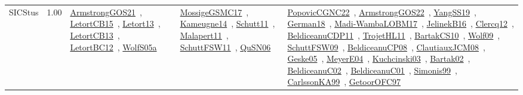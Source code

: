 {\begin{longtable}{p{3cm}r>{\raggedright\arraybackslash}p{6cm}>{\raggedright\arraybackslash}p{6cm}>{\raggedright\arraybackslash}p{8cm}}
\index{SICStus}\index{CPSystems!SICStus}SICStus &  1.00 & \href{../works/ArmstrongGOS21.pdf}{ArmstrongGOS21}~\cite{ArmstrongGOS21}, \href{../works/LetortCB15.pdf}{LetortCB15}~\cite{LetortCB15}, \href{../works/Letort13.pdf}{Letort13}~\cite{Letort13}, \href{../works/LetortCB13.pdf}{LetortCB13}~\cite{LetortCB13}, \href{../works/LetortBC12.pdf}{LetortBC12}~\cite{LetortBC12}, \href{../works/WolfS05a.pdf}{WolfS05a}~\cite{WolfS05a} & \href{../works/MossigeGSMC17.pdf}{MossigeGSMC17}~\cite{MossigeGSMC17}, \href{../works/Kameugne14.pdf}{Kameugne14}~\cite{Kameugne14}, \href{../works/Schutt11.pdf}{Schutt11}~\cite{Schutt11}, \href{../works/Malapert11.pdf}{Malapert11}~\cite{Malapert11}, \href{../works/SchuttFSW11.pdf}{SchuttFSW11}~\cite{SchuttFSW11}, \href{../works/QuSN06.pdf}{QuSN06}~\cite{QuSN06} & \href{../works/PopovicCGNC22.pdf}{PopovicCGNC22}~\cite{PopovicCGNC22}, \href{../works/ArmstrongGOS22.pdf}{ArmstrongGOS22}~\cite{ArmstrongGOS22}, \href{../works/YangSS19.pdf}{YangSS19}~\cite{YangSS19}, \href{../works/German18.pdf}{German18}~\cite{German18}, \href{../works/Madi-WambaLOBM17.pdf}{Madi-WambaLOBM17}~\cite{Madi-WambaLOBM17}, \href{../works/JelinekB16.pdf}{JelinekB16}~\cite{JelinekB16}, \href{../works/Clercq12.pdf}{Clercq12}~\cite{Clercq12}, \href{../works/BeldiceanuCDP11.pdf}{BeldiceanuCDP11}~\cite{BeldiceanuCDP11}, \href{../works/TrojetHL11.pdf}{TrojetHL11}~\cite{TrojetHL11}, \href{../works/BartakCS10.pdf}{BartakCS10}~\cite{BartakCS10}, \href{../works/Wolf09.pdf}{Wolf09}~\cite{Wolf09}, \href{../works/SchuttFSW09.pdf}{SchuttFSW09}~\cite{SchuttFSW09}, \href{../works/BeldiceanuCP08.pdf}{BeldiceanuCP08}~\cite{BeldiceanuCP08}, \href{../works/ClautiauxJCM08.pdf}{ClautiauxJCM08}~\cite{ClautiauxJCM08}, \href{../works/Geske05.pdf}{Geske05}~\cite{Geske05}, \href{../works/MeyerE04.pdf}{MeyerE04}~\cite{MeyerE04}, \href{../works/Kuchcinski03.pdf}{Kuchcinski03}~\cite{Kuchcinski03}, \href{../works/Bartak02.pdf}{Bartak02}~\cite{Bartak02}, \href{../works/BeldiceanuC02.pdf}{BeldiceanuC02}~\cite{BeldiceanuC02}, \href{../works/BeldiceanuC01.pdf}{BeldiceanuC01}~\cite{BeldiceanuC01}, \href{../works/Simonis99.pdf}{Simonis99}~\cite{Simonis99}, \href{../works/CarlssonKA99.pdf}{CarlssonKA99}~\cite{CarlssonKA99}, \href{../works/GetoorOFC97.pdf}{GetoorOFC97}~\cite{GetoorOFC97}\\

\end{longtable}}
